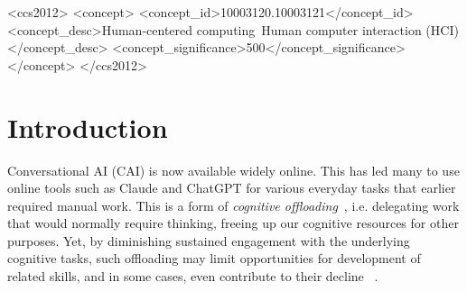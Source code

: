 \documentclass[manuscript,screen,review]{acmart}
\begin{document}
\begin{CCSXML}
<ccs2012>
   <concept>
       <concept_id>10003120.10003121</concept_id>
       <concept_desc>Human-centered computing~Human computer interaction (HCI)</concept_desc>
       <concept_significance>500</concept_significance>
       </concept>
 </ccs2012>
\end{CCSXML}



\maketitle

\section{Introduction}

Conversational AI (CAI) is now available widely online. 
This has led many to use online tools such as Claude and ChatGPT for various everyday tasks that earlier required manual work.
This is a form of \textit{cognitive offloading}~\cite{Risko2016}, i.e. delegating work that would normally require thinking, freeing up our cognitive resources for other purposes. 
Yet, by diminishing sustained engagement with the underlying cognitive tasks, such offloading may limit opportunities for development of related skills, and in some cases, even contribute to their decline ~\cite{yourbrainongpt25}. 
\end{document}

